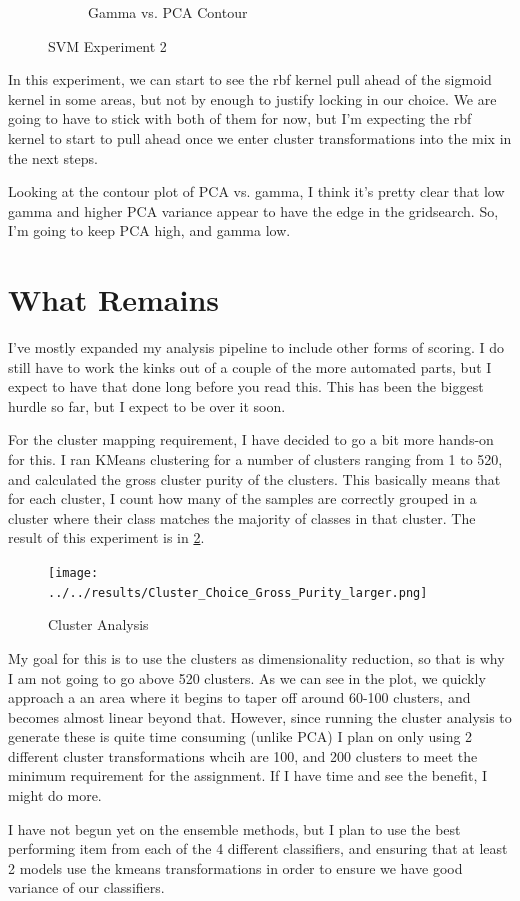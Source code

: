 \documentclass[12pt]{article}
\begin{document}
\begin{figure}
\begin{subfigure}{.95\textwidth}
        \caption{Gamma vs. PCA Contour}
    \end{subfigure}
    \caption{SVM Experiment 2}
    \label{figure9}
\end{figure}

In this experiment, we can start to see the rbf kernel pull ahead of the sigmoid kernel in some areas, but not by enough 
to justify locking in our choice. We are going to have to stick with both of them for now, but I'm expecting the rbf kernel 
to start to pull ahead once we enter cluster transformations into the mix in the next steps.

Looking at the contour plot of PCA vs. gamma, I think it's pretty clear that low gamma and higher PCA variance appear to 
have the edge in the gridsearch. So, I'm going to keep PCA high, and gamma low.

\section{What Remains}
I've mostly expanded my analysis pipeline to include other forms of scoring. I do still have to work the kinks out of 
a couple of the more automated parts, but I expect to have that done long before you read this. This has been the biggest 
hurdle so far, but I expect to be over it soon.

For the cluster mapping requirement, I have decided to go a bit more hands-on for this. I ran KMeans clustering for a number 
of clusters ranging from 1 to 520, and calculated the gross cluster purity of the clusters. This basically means that 
for each cluster, I count how many of the samples are correctly grouped in a cluster where their class matches the majority 
of classes in that cluster. The result of this experiment is in \ref{figure10}.

\begin{figure}
    \texttt{[image: ../../results/Cluster\_Choice\_Gross\_Purity\_larger.png]}
    \caption{Cluster Analysis}
    \label{figure10}
\end{figure}

My goal for this is to use the clusters as dimensionality reduction, so that is why I am not going to go above 520 clusters.
As we can see in the plot, we quickly approach a an area where it begins to taper off around 60-100 clusters, and becomes
almost linear beyond that. However, since running the cluster analysis to generate these is quite time consuming (unlike PCA)
I plan on only using 2 different cluster transformations whcih are 100, and 200 clusters to meet the minimum requirement for 
the assignment. If I have time and see the benefit, I might do more.


I have not begun yet on the ensemble methods, but I plan to use the best performing item from each of the 4 different classifiers, and 
ensuring that at least 2 models use the kmeans transformations in order to ensure we have good variance of our classifiers.
\end{document}
